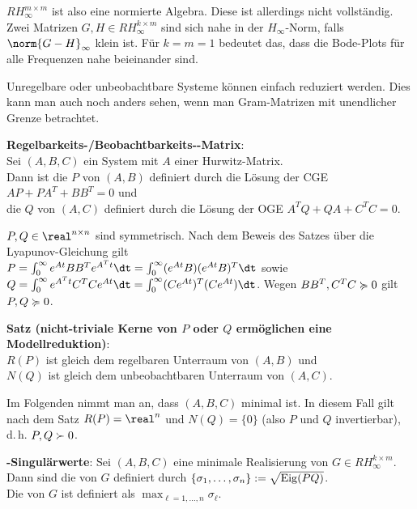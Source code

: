 $RH_\infty^{m \times m}$ ist also eine normierte Algebra.
Diese ist allerdings nicht vollständig.
Zwei Matrizen $G, H \in RH_\infty^{k \times m}$ sind sich nahe in der $H_\infty$-Norm, falls
$\norm{G - H}_\infty$ klein ist.
Für $k = m = 1$ bedeutet das, dass die Bode-Plots für alle Frequenzen nahe beieinander sind.

\linie

Unregelbare oder unbeobachtbare Systeme können einfach reduziert werden.
Dies kann man auch noch anders sehen, wenn man Gram-Matrizen mit unendlicher Grenze betrachtet.

\textbf{Regelbarkeits-/Beobachtbarkeits--Matrix}:\\
Sei $(A, B, C)$ ein System mit $A$ einer Hurwitz-Matrix.\\
Dann ist die 
$P$ von $(A, B)$ definiert durch die Lösung der CGE $AP + PA^T + BB^T = 0$ und\\
die 
$Q$ von $(A, C)$ definiert durch die Lösung der OGE $A^T Q + QA + C^T C = 0$.

$P, Q \in \real^{n \times n}$ sind symmetrisch.
Nach dem Beweis des Satzes über die Lyapunov-Gleichung gilt\\
$P = \int_0^\infty e^{At} BB^T e^{A^T t} \dt = \int_0^\infty (e^{At} B) (e^{At} B)^T \dt$
sowie\\
$Q = \int_0^\infty e^{A^T t} C^T C e^{At} \dt = \int_0^\infty (C e^{At})^T (C e^{At}) \dt$.
Wegen $BB^T, C^T C \succcurlyeq 0$ gilt $P, Q \succcurlyeq 0$.

\textbf{Satz (nicht-triviale Kerne von $P$ oder $Q$ ermöglichen eine Modellreduktion)}:\\
$R(P)$ ist gleich dem regelbaren Unterraum von $(A, B)$ und\\
$N(Q)$ ist gleich dem unbeobachtbaren Unterraum von $(A, C)$.

\linie

Im Folgenden nimmt man an, dass $(A, B, C)$ minimal ist.
In diesem Fall gilt nach dem Satz $R(P) = \real^n$ und $N(Q) = \{0\}$
(also $P$ und $Q$ invertierbar), d.\,h. $P, Q \succ 0$.

\textbf{-Singulärwerte}:
Sei $(A, B, C)$ eine minimale Realisierung von $G \in RH_\infty^{k \times m}$.\\
Dann sind die  von $G$ definiert durch
$\{\sigma_1, \dotsc, \sigma_n\} := \sqrt{\operatorname{Eig}(PQ)}$.\\
Die  von $G$ ist definiert als
$\max_{\ell=1,\dotsc,n} \sigma_\ell$.

